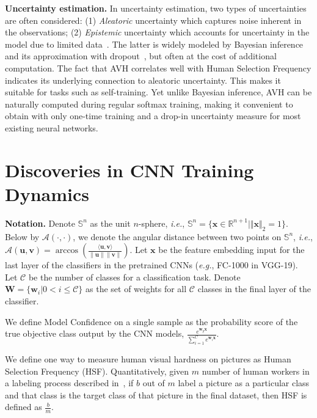 \textbf{Uncertainty estimation.} In uncertainty estimation, two types of uncertainties are often considered: (1) \textit{Aleatoric} uncertainty which captures noise inherent in the observations; (2) \textit{Epistemic} uncertainty which accounts for uncertainty in the model due to limited data~\cite{der2009aleatory}. The latter is widely modeled by Bayesian inference~\cite{kendall2017uncertainties} and its approximation with dropout~\cite{gal2016dropout,gal2017concrete}, but often at the cost of additional computation. The fact that AVH correlates well with Human Selection Frequency indicates its underlying connection to aleatoric uncertainty. This makes it suitable for tasks such as self-training. Yet unlike Bayesian inference, AVH can be naturally computed during regular softmax training, making it convenient to obtain with only one-time training and a drop-in uncertainty measure for most existing neural networks.

\section{Discoveries in CNN Training Dynamics}\label{sec:dynamics}

\textbf{Notation.} Denote $\mathbb{S}^{n}$ as the unit $n$-sphere, \emph{i.e.},
$\mathbb{S}^{n}=\{\bm{x}\in\mathbb{R}^{n+1}|\Vert \bm{x} \Vert_2=1\}$.  
Below by $\mathcal{A}(\cdot,\cdot)$, we denote the angular distance between two points on $\mathbb{S}^{n}$, \emph{i.e.}, $\mathcal{A}(\bm{u},\bm{v})=\arccos(\frac{\langle\bm{u},\bm{v}\rangle}{\|\bm{u}\|\|\bm{v}\|})$. 
Let $\bm{x}$ be the feature embedding input for the last layer of the classifiers in the pretrained CNNs (\emph{e.g.}, FC-1000 in VGG-19). Let $\mathcal{C}$ be the number of classes for a classification task. Denote $\bm{W} = \{\bm{w}_i| 0 < i \leq \mathcal{C}\}$ as the set of weights for all $\mathcal{C}$ classes in the final layer of the classifier.

\begin{defn} We define Model Confidence on a single sample as the probability score of the true objective class output by the CNN models, $ \frac{e^{\bm{w}_y\bm{x}}}{\sum_{i=1}^{C}e^{\bm{w}_i\bm{x}}}$.
\end{defn}

\begin{defn} We define one way to measure human visual hardness on pictures as Human Selection Frequency (HSF). Quantitatively, given $m$ number of human workers in a labeling process described in~\cite{recht2019imagenet}, if $b$ out of $m$ label a picture as a particular class and that class is the target class of that picture in the final dataset, then HSF is defined as $\frac{b}{m}$.  
\end{defn}

